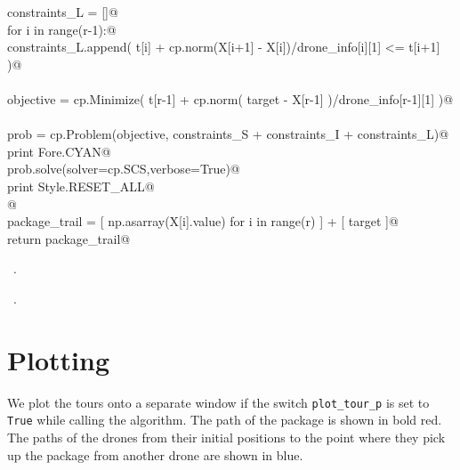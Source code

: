 \documentclass[10.0pt]{report}
\begin{document}
\begin{flushleft}
\begin{list}{}{}
\mbox{}\verb@    constraints_L = []@\\
\mbox{}\verb@    for i in range(r-1):@\\
\mbox{}\verb@         constraints_L.append( t[i] + cp.norm(X[i+1] - X[i])/drone_info[i][1] <= t[i+1] )@\\
\mbox{}\verb@@\\
\mbox{}\verb@    objective = cp.Minimize(  t[r-1]  + cp.norm( target - X[r-1]  )/drone_info[r-1][1]  )@\\
\mbox{}\verb@@\\
\mbox{}\verb@    prob = cp.Problem(objective, constraints_S + constraints_I + constraints_L)@\\
\mbox{}\verb@    print Fore.CYAN@\\
\mbox{}\verb@    prob.solve(solver=cp.SCS,verbose=True)@\\
\mbox{}\verb@    print Style.RESET_ALL@\\
\mbox{}\verb@    @\\
\mbox{}\verb@    package_trail = [ np.asarray(X[i].value) for i in range(r) ] + [ target ]@\\
\mbox{}\verb@    return package_trail@\\
\mbox{}\verb@@{\NWsep}
\end{list}
\vspace{-1.5ex}
\footnotesize
\begin{list}{}{\setlength{\itemsep}{-\parsep}\setlength{\itemindent}{-\leftmargin}}
\item \NWtxtMacroDefBy\ .
\item \NWtxtMacroRefIn\ .

\item{}
\end{list}
\vspace{4ex}
\end{flushleft}

\section{Plotting}

We plot the tours onto a separate window if the switch \verb|plot_tour_p| is set to \verb|True| 
while calling the algorithm. The path of the package is shown in bold red. The paths of the drones 
from their initial positions to the point where they pick up the package from another drone 
are shown in blue.
\end{document}
